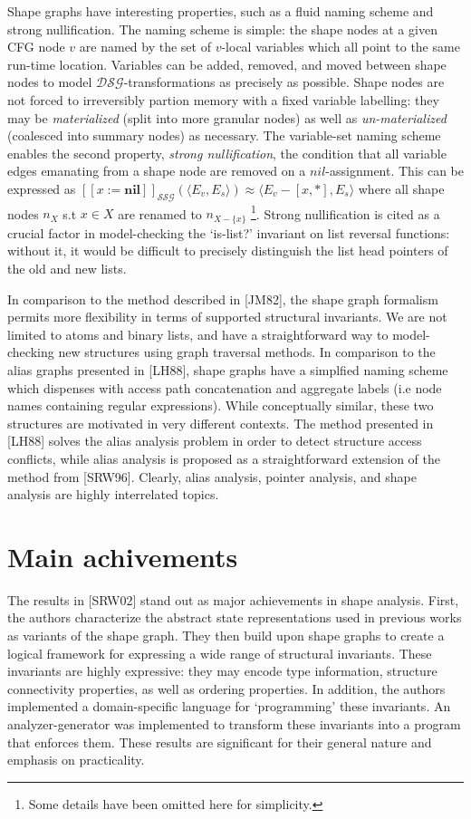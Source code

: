 \documentclass{article}
\begin{document}
Shape graphs have interesting properties, such as a fluid naming scheme and
strong nullification. The naming scheme is simple: the shape nodes at a
given CFG node $v$ are named by the set of $v$-local variables which all
point to the same run-time location.  Variables can be added, removed, and
moved between shape nodes to model $\mathcal{DSG}$-transformations as
precisely as possible. Shape nodes are not forced to irreversibly partion
memory with a fixed variable labelling: they may be \textit{materialized}
(split into more granular nodes) as well as \textit{un-materialized}
(coalesced into summary nodes) as necessary.  The variable-set naming scheme
enables the second property, \textit{strong nullification}, the condition
that all variable edges emanating from a shape node are removed on a
$nil$-assignment. This can be expressed as $[\![x :=
\textbf{nil}]\!]_{\mathcal{SSG}}(\langle E_v, E_s \rangle) \approx \langle
E_v - [x, *], E_s \rangle$ where all shape nodes $n_X$ s.t $x \in X$ are
renamed to $n_{X - \{x\}}$ \footnote{Some details have been omitted here for
simplicity.}. Strong nullification is cited as a crucial factor in
model-checking the `is-list?' invariant on list reversal functions: without
it, it would be difficult to precisely distinguish the list head pointers of
the old and new lists.

In comparison to the method described in [JM82], the shape graph formalism
permits more flexibility in terms of supported structural invariants. We are
not limited to atoms and binary lists, and have a straightforward way to
model-checking new structures using graph traversal methods. In comparison
to the alias graphs presented in [LH88], shape graphs have a simplfied
naming scheme which dispenses with access path concatenation and aggregate
labels (i.e node names containing regular expressions). While conceptually
similar, these two structures are motivated in very different contexts. The
method presented in [LH88] solves the alias analysis problem in order to
detect structure access conflicts, while alias analysis is proposed as a
straightforward extension of the method from [SRW96]. Clearly, alias
analysis, pointer analysis, and shape analysis are highly interrelated
topics.

\section{Main achivements}

The results in [SRW02] stand out as major achievements in shape analysis.
First, the authors characterize the abstract state representations used in
previous works as variants of the shape graph. They then build upon shape
graphs to create a logical framework for expressing a wide range of
structural invariants.  These invariants are highly expressive: they may
encode type information, structure connectivity properties, as well as
ordering properties. In addition, the authors implemented a domain-specific
language for `programming' these invariants. An analyzer-generator was
implemented to transform these invariants into a program that enforces them.
These results are significant for their general nature and emphasis on
practicality.
\end{document}

